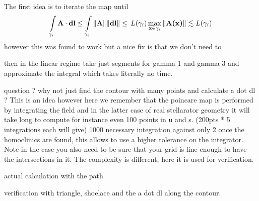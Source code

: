 The first idea is to iterate the map until 
\begin{align*}
    \int\limits_{\gamma_i} \textbf{A}\cdot\textbf{dl} \leq \int\limits_{\gamma_i} \Vert\textbf{A}\Vert \Vert\textbf{dl}\Vert \leq\, L(\gamma_i)\max\limits_{\textbf{x} \in\gamma_i}\Vert\textbf{A(\textbf{x})}\Vert \lesssim L(\gamma_i)
\end{align*}
however this was found to work but a nice fix is that we don't need to 

then in the linear regime take just segments for gamma 1 and gamma 3 and approximate the integral which takes literally no time.

question ? why not just find the contour with many points and calculate a dot dl ? This is an idea however here we remember that the poincare map is performed by integrating the field and in the latter case of real stellarator geometry it will take long to compute for instance even 100 points in u and s. (200pts * 5 integrations each will give) 1000 necessary integration against only 2 once the homoclinics are found, this allows to use a higher tolerance on the integrator. Note in the case you also need to be sure that your grid is fine enough to have the intersections in it. The complexity is different, here it is used for verification.

actual calculation with the path 

verification with triangle, shoelace and the a dot dl along the contour.